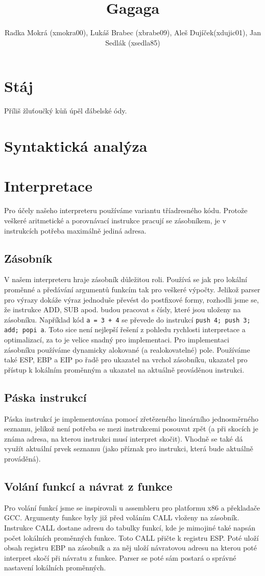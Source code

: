 \documentclass[a4paper,11pt,titlepage]{article}
\author{Radka Mokrá (xmokra00), Lukáš Brabec (xbrabe09), Aleš Dujíček(xdujic01), Jan Sedlák (xsedla85)}
\title{Gagaga}
\begin{document}
\maketitle
\tableofcontents

\section{Stáj}
Příliš žluťoučký kůň úpěl ďábelské ódy.
\section{Syntaktická analýza}

\section{Interpretace}
Pro účely našeho interpreteru používáme variantu tříadresného kódu. Pro\-to\-že veškeré aritmetické a porovnávací instrukce pracují se zásobníkem, je v instrukcích potřeba maximálně jediná adresa.
\subsection{Zásobník}
V našem interpreteru hraje zásobník důležitou roli. Používá se jak pro lokální proměnné a předávání argumentů funkcím tak pro veškeré výpočty. Jelikož parser pro výrazy dokáže výraz jednoduše převést do postfixové formy, rozhodli jsme se, že instrukce ADD, SUB apod. budou pracovat s čísly, které jsou uloženy na zásobníku. Například kód {\tt a = 3 + 4} se převede do instrukcí {\tt push 4; push 3; add; popi a}. Toto sice není nejlepší řešení z pohledu rychlosti interpretace a optimalizací, za to je velice snadný pro implementaci. Pro implementaci zásobníku používáme dynamicky alokované (a realokovatelné) pole. Používáme také  ESP, EBP a EIP po řadě pro ukazatel na vrchol zásobníku, ukazatel pro přístup k lokálním proměnným a ukazatel na aktuálně prováděnou instrukci.
\subsection{Páska instrukcí}
Páska instrukcí je implementována pomocí zřetězeného lineárního jedno\-směr\-né\-ho seznamu, jelikož není potřeba se mezi instrukcemi posouvat zpět (a při skocích je známa adresa, na kterou instrukci musí interpret skočit). Vhodně se také dá využít aktuální prvek seznamu (jako příznak pro instrukci, která bude aktuálně prováděná).
\subsection{Volání funkcí a návrat z funkce}
Pro volání funkcí jsme se inspirovali u assembleru pro platformu x86 a překladače GCC. Argumenty funkce byly již před voláním CALL vloženy na zásobník. Instrukce CALL dostane adresu do tabulky funkcí, kde je mimojiné také napsán počet lokálních pro\-měn\-ných funkce. Toto CALL přičte k registru ESP. Poté uloží obsah registru EBP na zásobník a za něj uloží návratovou adresu na kterou poté interpret skočí při návratu z funkce. Parser se poté sám postará o správné nastavení lokálních proměnných.
\end{document}
